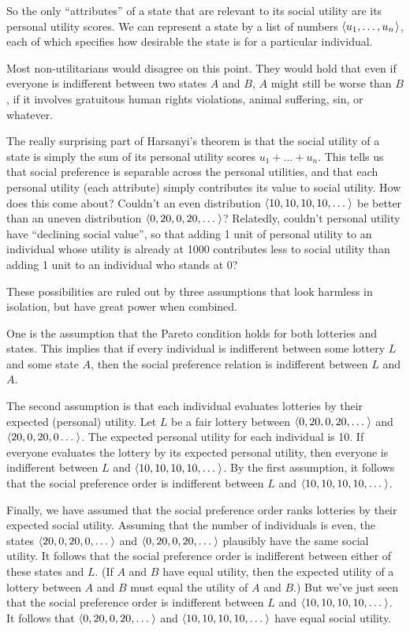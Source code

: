 So the only ``attributes'' of a state that are relevant to its social utility
are its personal utility scores. We can represent a state by a list of numbers
$\t{u_{1}, \ldots, u_{n} }$, each of which specifies how desirable the state is
for a particular individual.

Most non-utilitarians would disagree on this point. They would hold that even if
everyone is indifferent between two states $A$ and $B$, $A$ might still be worse
than $B$, if it involves gratuitous human rights violations, animal suffering,
sin, or whatever.

The really surprising part of Harsanyi's theorem is that the social utility of a
state is simply the sum of its personal utility scores $u_{1} + \ldots + u_{n}$.
This tells us that social preference is separable across the personal utilities,
and that each personal utility (each attribute) simply contributes its value to
social utility. How does this come about? Couldn't an even distribution
$\t{10,10,10,10,\ldots }$ be better than an uneven distribution
$\t{0,20,0,20,\ldots}$? Relatedly, couldn't personal utility have ``declining
social value'', so that adding 1 unit of personal utility to an individual whose
utility is already at 1000 contributes less to social utility than adding 1 unit
to an individual who stands at 0?

These possibilities are ruled out by three assumptions that look harmless in
isolation, but have great power when combined.

One is the assumption that the Pareto condition holds for both lotteries and
states. This implies that if every individual is indifferent between some
lottery $L$ and some state $A$, then the social preference relation is
indifferent between $L$ and $A$.

The second assumption is that each individual evaluates lotteries by their
expected (personal) utility. Let $L$ be a fair lottery between
$\t{0,20,0,20,\ldots}$ and $\t{20,0,20,0\ldots }$. The expected personal utility
for each individual is 10. If everyone evaluates the lottery by its expected
personal utility, then everyone is indifferent between $L$ and
$\t{10,10,10,10,\ldots}$. By the first assumption, it follows that the social
preference order is indifferent between $L$ and $\t{10,10,10,10,\ldots}$.

Finally, we have assumed that the social preference order ranks lotteries by
their expected social utility. Assuming that the number of individuals is even,
the states $\t{20,0,20,0,\ldots}$ and $\t{0,20,0,20,\ldots }$ plausibly
have the same social utility. It follows that the social preference order is
indifferent between either of these states and $L$. (If $A$ and $B$ have equal
utility, then the expected utility of a lottery between $A$ and $B$ must equal
the utility of $A$ and $B$.) But we've just seen that the social preference
order is indifferent between $L$ and $\t{10,10,10,10,\ldots}$. It follows that
$\t{0,20,0,20,\ldots}$ and $\t{10,10,10,10,\ldots}$ have equal social utility.

